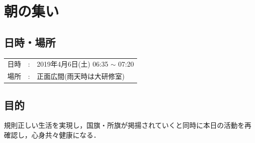 %

\section{朝の集い}

\subsection{日時・場所}
\begin{tabular}{p{}rp{}}
  日時 & : & 2019年4月6日(土) 06:35 $\sim$ 07:20\\
  場所 & : & 正面広間(雨天時は大研修室)　\\
\end{tabular}

\subsection{目的}
規則正しい生活を実現し，国旗・所旗が掲揚されていくと同時に本日の活動を再確認し，心身共々健康になる．

